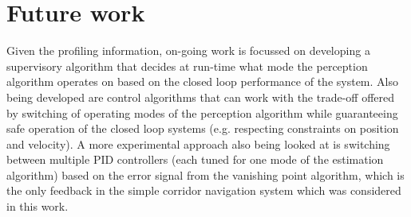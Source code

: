 \section{Future work}

Given the profiling information, on-going work is focussed on developing a supervisory algorithm that decides at run-time what mode the perception algorithm operates on based on the closed loop performance of the system. Also being developed are control algorithms that can work with the trade-off offered by switching of operating modes of the perception algorithm while guaranteeing safe operation of the closed loop systems (e.g. respecting constraints on position and velocity). A more experimental approach also being looked at is switching between multiple PID controllers (each tuned for one mode of the estimation algorithm) based on the error signal from the vanishing point algorithm, which is the only feedback in the simple corridor navigation system which was considered in this work.
